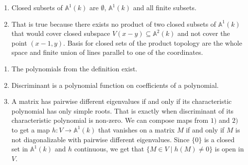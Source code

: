 \newcommand{\sheet}{1}




\maketitle

\begin{exercise}{1}
    \begin{enumerate}
        \item{} Closed subsets of $\mathbb{A}^1(k)$ are $\emptyset$,
            $\mathbb{A}^1(k)$ and all finite subsets.
        \item{} That is true because there exists no product of two closed subsets
            of $\mathbb{A}^1(k)$ that would cover closed subspace $V(x - y)
            \subseteq \mathbb{A}^2(k)$ and not cover the point $(x - 1, y)$.
            Basis for closed sets of the product topology are the whole space
            and finite union of lines parallel to one of the coordinates.
    \end{enumerate}
\end{exercise}

\begin{exercise}{2}
    \begin{enumerate}
        \item The polynomials from the definition exist.
        \item Discriminant is a polynomial function on coefficients of a
            polynomial.
        \item A matrix has pairwise different eigenvalues if and only if its
            characteristic polynomial has only simple roots. That is exactly
            when discriminant of its characteristic polynomial is non-zero. We
            can compose maps from $1)$ and $2)$ to get a map $h \colon V
            \rightarrow \mathbb{A}^1(k)$ that vanishes on a matrix $M$ if and
            only if $M$ is not diagonalizable with pairwise different
            eigenvalues. Since $\{0\}$ is a closed set in $\mathbb{A}^1(k)$ and
            $h$ continuous, we get that $\{ M \in V \mid h(M) \not= 0 \}$ is
            open in $V$.
    \end{enumerate}
\end{exercise}


